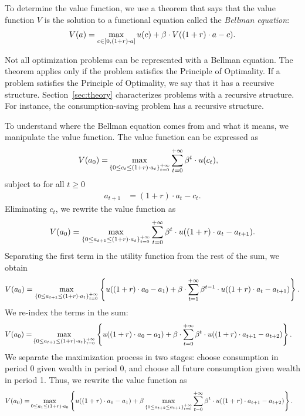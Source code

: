 \documentclass[letterpaper,12pt,leqno]{article}
\begin{document}
To determine the value function, we use a theorem that says that the value function $V$ is the solution to a functional equation called the \textit{Bellman equation}:
\begin{align}
 V(a)=\max[c\in[0,(1+r)\cdot a]] u(c)+\b  \cdot V((1+r)\cdot a-c).\label{eq:recur}
\end{align}

Not all optimization problems can be represented with a Bellman equation. The theorem applies only if the problem satisfies the Principle of Optimality. If a problem satisfies the Principle of Optimality, we say that it has a recursive structure. Section~\ref{sec:theory} characterizes problems with a recursive structure. For instance, the consumption-saving problem has a recursive structure.

To understand where the Bellman equation comes from and what it means, we manipulate the value function. The value function can be expressed as
\begin{align*}
V(a_0)=&\max[\{0\leq c_t\leq (1+r)\cdot a_t\}_{t=0}^{+\infty}] \sum_{t=0}^{+\infty}\b^t  \cdot u(c_t),
\end{align*}
subject to for all $t\geq 0$
\begin{align*}
a_{t+1}&=(1+r)\cdot a_t-c_t.
\end{align*}
Eliminating $c_t$, we rewrite the value function as
\begin{align*}
V(a_0)=\max[\{0\leq a_{t+1}\leq (1+r)\cdot a_t\}_{t=0}^{+\infty}] \sum_{t=0}^{+\infty}\b^t \cdot  u((1+r)\cdot a_t-a_{t+1}).
\end{align*}
Separating the first term in the utility function from the rest of the sum, we obtain
\begin{align*}
V(a_0)=\max[\{0\leq a_{t+1}\leq  (1+r)\cdot a_t\}_{t=0}^{+\infty}] \bc{u((1+r)\cdot a_0-a_1)+\b \cdot \sum_{t=1}^{+\infty}\b^{t-1} \cdot u((1+r)\cdot a_t-a_{t+1})}.
\end{align*}
We re-index the terms in the sum:
\begin{align*}
V(a_0)=&\max[\{0\leq a_{t+1}\leq  (1+r)\cdot a_t\}_{t=0}^{+\infty}] \bc{u((1+r)\cdot a_0-a_1)+\b \cdot \sum_{t=0}^{+\infty}\b^{t} \cdot u((1+r)\cdot a_{t+1}-a_{t+2})}.
\end{align*}
We separate the maximization process in two stages: choose consumption in period 0 given wealth in period 0, and choose all future consumption given wealth in period 1. Thus, we rewrite the value function as
\begin{align*}
V(a_0)=&\max_{0\leq a_{1}\leq (1+r)\cdot a_0}\bc{u((1+r)\cdot a_0-a_1)+\b\max_{\{0\leq a_{t+2}\leq a_{t+1}\}_{t=0}^{+\infty}}\sum_{t=0}^{+\infty}\b^{t} \cdot  u((1+r)\cdot a_{t+1}-a_{t+2})}.
\end{align*}
\end{document}
